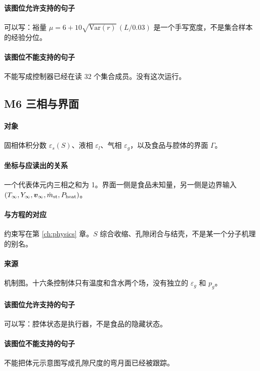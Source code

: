 \paragraph{该图位允许支持的句子}
可以写：裕量 $\mu=6+10\sqrt{\mathrm{Var}(r)}\,(L/0.03)$ 是一个手写宽度，不是集合样本的经验分位。

\paragraph{该图位不能支持的句子}
不能写成控制器已经在读 32 个集合成员。没有这次运行。

\subsection{M6 三相与界面}
\paragraph{对象}
固相体积分数 $\varepsilon_s(S)$、液相 $\varepsilon_l$、气相 $\varepsilon_g$，以及食品与腔体的界面 $\Gamma$。

\paragraph{坐标与应读出的关系}
一个代表体元内三相之和为 1。界面一侧是食品未知量，另一侧是边界输入 $(T_\infty,Y_\infty,\bm{v}_\infty,\dot m_{\mathrm{st}},P_{\mathrm{heat}})$。

\paragraph{与方程的对应}
约束写在第 \ref{ch:physics} 章。$S$ 综合收缩、孔隙闭合与结壳，不是某一个分子机理的别名。

\paragraph{来源}
机制图。十六条控制体只有温度和含水两个场，没有独立的 $\varepsilon_g$ 和 $p_g$。

\paragraph{该图位允许支持的句子}
可以写：腔体状态是执行器，不是食品的隐藏状态。

\paragraph{该图位不能支持的句子}
不能把体元示意图写成孔隙尺度的弯月面已经被跟踪。

